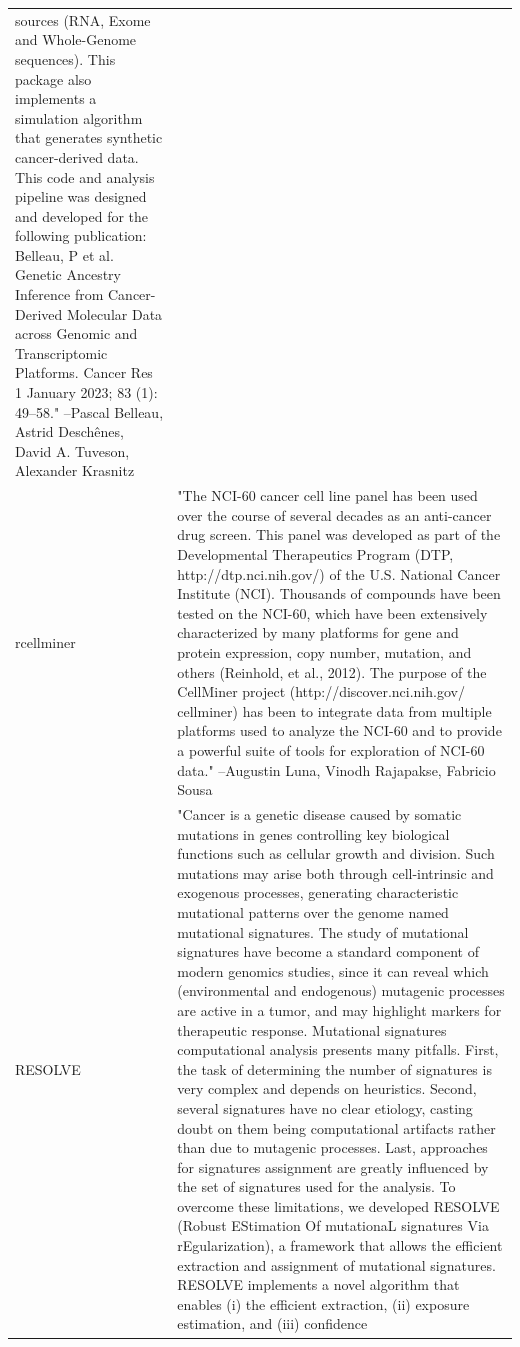 \begin{longtable}[t]{l>{\raggedright\arraybackslash}p{25em}}
sources (RNA, Exome and Whole-Genome sequences). This package
also implements a simulation algorithm that generates synthetic
cancer-derived data. This code and analysis pipeline was
designed and developed for the following publication: Belleau,
P et al. Genetic Ancestry Inference from Cancer-Derived
Molecular Data across Genomic and Transcriptomic Platforms.
Cancer Res 1 January 2023; 83 (1): 49–58." --Pascal Belleau, Astrid Deschênes, David A. Tuveson, Alexander Krasnitz\\
rcellminer & "The NCI-60 cancer cell line panel has been used over the
course of several decades as an anti-cancer drug screen. This
panel was developed as part of the Developmental Therapeutics
Program (DTP, http://dtp.nci.nih.gov/) of the U.S. National
Cancer Institute (NCI). Thousands of compounds have been tested
on the NCI-60, which have been extensively characterized by
many platforms for gene and protein expression, copy number,
mutation, and others (Reinhold, et al., 2012). The purpose of
the CellMiner project (http://discover.nci.nih.gov/ cellminer)
has been to integrate data from multiple platforms used to
analyze the NCI-60 and to provide a powerful suite of tools for
exploration of NCI-60 data." --Augustin Luna, Vinodh Rajapakse, Fabricio Sousa\\
RESOLVE & "Cancer is a genetic disease caused by somatic mutations in
genes controlling key biological functions such as cellular
growth and division. Such mutations may arise both through
cell-intrinsic and exogenous processes, generating
characteristic mutational patterns over the genome named
mutational signatures. The study of mutational signatures have
become a standard component of modern genomics studies, since
it can reveal which (environmental and endogenous) mutagenic
processes are active in a tumor, and may highlight markers for
therapeutic response. Mutational signatures computational
analysis presents many pitfalls. First, the task of determining
the number of signatures is very complex and depends on
heuristics. Second, several signatures have no clear etiology,
casting doubt on them being computational artifacts rather than
due to mutagenic processes. Last, approaches for signatures
assignment are greatly influenced by the set of signatures used
for the analysis. To overcome these limitations, we developed
RESOLVE (Robust EStimation Of mutationaL signatures Via
rEgularization), a framework that allows the efficient
extraction and assignment of mutational signatures. RESOLVE
implements a novel algorithm that enables (i) the efficient
extraction, (ii) exposure estimation, and (iii) confidence

\end{longtable}

